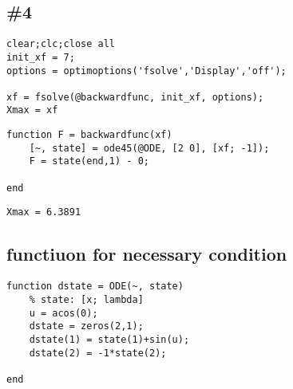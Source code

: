\documentclass[12pt]{article}
\begin{document}
\subsection*{\#4}

\begin{verbatim}
clear;clc;close all
init_xf = 7;
options = optimoptions('fsolve','Display','off');

xf = fsolve(@backwardfunc, init_xf, options);
Xmax = xf
\end{verbatim}

\begin{verbatim}
function F = backwardfunc(xf)
    [~, state] = ode45(@ODE, [2 0], [xf; -1]);
    F = state(end,1) - 0;

end
\end{verbatim}

\color{lightgray} \begin{verbatim}
Xmax = 6.3891
\end{verbatim} \color{black}

\subsection*{functiuon for necessary condition}

\begin{verbatim}
function dstate = ODE(~, state)
    % state: [x; lambda]
    u = acos(0);
    dstate = zeros(2,1);
    dstate(1) = state(1)+sin(u);
    dstate(2) = -1*state(2);

end
\end{verbatim}
\end{document}
